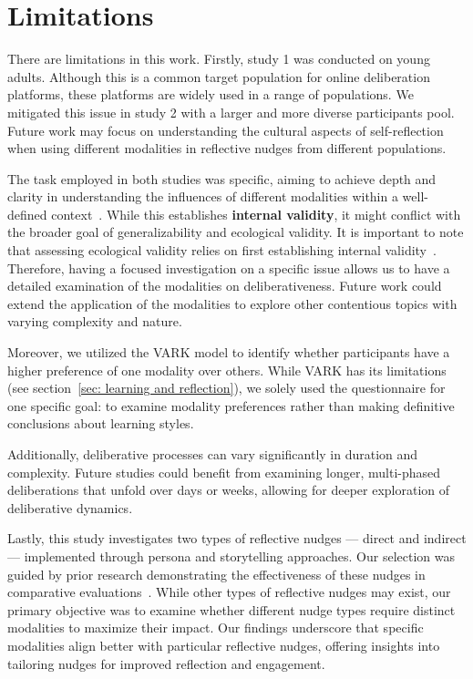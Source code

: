 \section{Limitations}
There are limitations in this work. Firstly, study 1 was conducted on young adults. Although this is a common target population for online deliberation platforms, these platforms are widely used in a range of populations. We mitigated this issue in study 2 with a larger and more diverse participants pool. Future work may focus on understanding the cultural aspects of self-reflection when using different modalities in reflective nudges from different populations.

The task employed in both studies was specific, aiming to achieve depth and clarity in understanding the influences of different modalities within a well-defined context~\cite{slack2001establishing}. While this establishes \textbf{internal validity}, it might conflict with the broader goal of generalizability and ecological validity. It is important to note that assessing ecological validity relies on first establishing internal validity~\cite{cahit2015internal, slack2001establishing, campbell2015experimental, cook1979quasi}. Therefore, having a focused investigation on a specific issue allows us to have a detailed examination of the modalities on deliberativeness. Future work could extend the application of the modalities to explore other contentious topics with varying complexity and nature.

Moreover, we utilized the VARK model to identify whether participants have a higher preference of one modality over others. While VARK has its limitations (see section~\ref{sec: learning and reflection}), we solely used the questionnaire for one specific goal: to examine modality preferences rather than making definitive conclusions about learning styles.

Additionally, deliberative processes can vary significantly in duration and complexity. Future studies could benefit from examining longer, multi-phased deliberations that unfold over days or weeks, allowing for deeper exploration of deliberative dynamics.

Lastly, this study investigates two types of reflective nudges — direct and indirect — implemented through persona and storytelling approaches. Our selection was guided by prior research demonstrating the effectiveness of these nudges in comparative evaluations~\cite{yeo2024help}. While other types of reflective nudges may exist, our primary objective was to examine whether different nudge types require distinct modalities to maximize their impact. Our findings underscore that specific modalities align better with particular reflective nudges, offering insights into tailoring nudges for improved reflection and engagement.